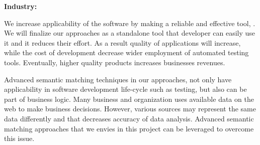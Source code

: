 \smallskip
\noindent
\textbf{Industry:}

\noindent
We increase applicability of the software by making a reliable and effective \testreuse tool, \toolreuse. 
We will finalize our approaches as a standalone tool that developer can easily use it and it reduces their effort.
As a result quality of applications will increase, while the cost of development decrease wider employment of automated testing tools.
Eventually, higher quality products increases businesses revenues.

Advanced semantic matching techniques in our \testreuse approaches, not only have applicability in software development life-cycle such as testing, but also can be part of business logic. 
Many business and organization uses available data on the web to make business decisions. 
However, various sources may represent the same data differently and that decreases accuracy of data analysis.
Advanced semantic matching approaches that we envies in this project can be leveraged to overcome this issue.
